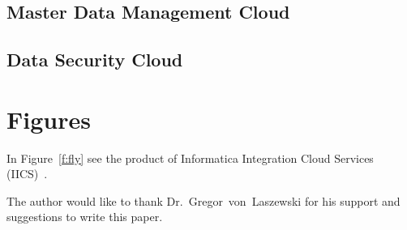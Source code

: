 \subsection{Master Data Management Cloud}

\subsection{Data Security Cloud}

\section{Figures}

In Figure~\ref{f:fly} see the product of Informatica Integration
Cloud Services (IICS)~\cite{hid-sp18-511-iics}.

\begin{acks}

The author would like to thank Dr.~Gregor~von~Laszewski for his
support and suggestions to write this paper.

\end{acks}


 
